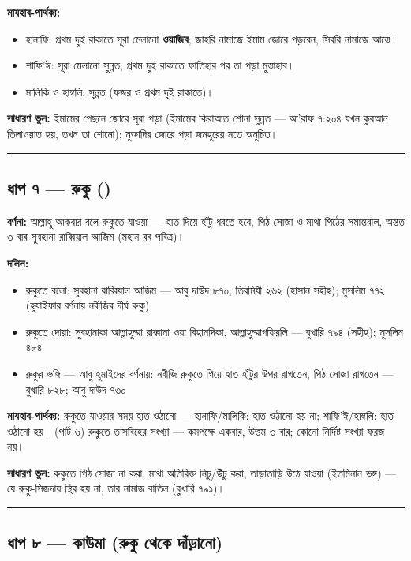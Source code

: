 \textbf{মাযহাব-পার্থক্য:}
\begin{itemize}
\item হানাফি: প্রথম দুই রাকাতে সূরা মেলানো \textbf{ওয়াজিব}; জাহরি নামাজে ইমাম জোরে পড়বেন, সিররি নামাজে আস্তে।
\item শাফি'ঈ: সূরা মেলানো সুন্নত; প্রথম দুই রাকাতে ফাতিহার পর তা পড়া মুস্তাহাব।
\item মালিকি ও হাম্বলি: সুন্নত (ফজর ও প্রথম দুই রাকাতে)।
\end{itemize}
\textbf{সাধারণ ভুল:} ইমামের পেছনে জোরে সূরা পড়া (ইমামের কিরাআত শোনা সুন্নত — আ'রাফ ৭:২০৪ যখন কুরআন তিলাওয়াত হয়, তখন তা শোনো); মুক্তাদির জোরে পড়া জমহুরের মতে অনুচিত।

\medskip\hrule\medskip

\subsection*{ধাপ ৭ — রুকু ()}

\textbf{বর্ণনা:} আল্লাহু আকবার বলে রুকুতে যাওয়া — হাত দিয়ে হাঁটু ধরতে হবে, পিঠ সোজা ও মাথা পিঠের সমান্তরাল, অন্তত ৩ বার সুবহানা রাব্বিয়াল আজিম (মহান রব পবিত্র)।

\textbf{দলিল:}
\begin{itemize}
\item {}রুকুতে বলো: সুবহানা রাব্বিয়াল আজিম — আবু দাউদ ৮৭০; তিরমিযী ২৬২ (হাসান সহীহ); মুসলিম ৭৭২ (হুযাইফার বর্ণনায় নবীজির দীর্ঘ রুকু)
\item রুকুতে দোয়া: সুবহানাকা আল্লাহুম্মা রাব্বানা ওয়া বিহামদিকা, আল্লাহুম্মাগফিরলি — বুখারি ৭৯৪ (সহীহ); মুসলিম ৪৮৪
\item রুকুর ভঙ্গি — আবু হুমাইদের বর্ণনায়: নবীজি রুকুতে গিয়ে হাত হাঁটুর উপর রাখতেন, পিঠ সোজা রাখতেন — বুখারি ৮২৮; আবু দাউদ ৭৩০
\end{itemize}
\textbf{মাযহাব-পার্থক্য:} রুকুতে যাওয়ার সময় হাত ওঠানো — হানাফি/মালিকি: হাত ওঠানো হয় না; শাফি'ঈ/হাম্বলি: হাত ওঠানো হয়। (পার্ট ৬) রুকুতে তাসবিহের সংখ্যা — কমপক্ষে একবার, উত্তম ৩ বার; কোনো নির্দিষ্ট সংখ্যা ফরজ নয়।

\textbf{সাধারণ ভুল:} রুকুতে পিঠ সোজা না করা, মাথা অতিরিক্ত নিচু/উঁচু করা, তাড়াতাড়ি উঠে যাওয়া (ইতমিনান ভঙ্গ) — যে রুকু-সিজদায় স্থির হয় না, তার নামাজ বাতিল (বুখারি ৭৯১)।

\medskip\hrule\medskip

\subsection*{ধাপ ৮ — কাউমা (রুকু থেকে দাঁড়ানো)}

